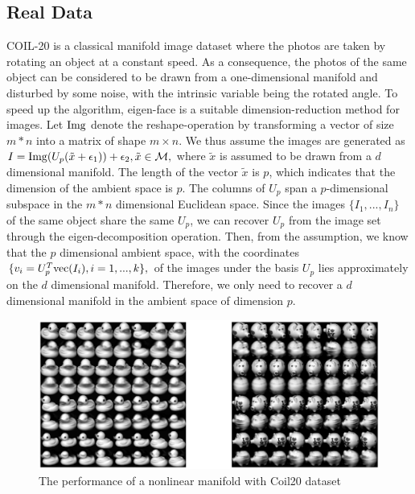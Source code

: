 \documentclass{article}
\theoremstyle{remark}
\begin{document}
\subsection{Real Data}
COIL-20 \cite{COIL-20} is a classical manifold image dataset where the photos are taken by rotating an object at a constant speed. As a consequence, the photos of the same object can be considered to be  drawn from a one-dimensional manifold and disturbed by some noise, with the intrinsic variable being the rotated angle. %
To speed up the algorithm, eigen-face is a suitable dimension-reduction method for images. Let ${\rm Img}$ denote the reshape-operation by transforming a vector of size $m*n$ into a matrix of shape $m\times n$. We thus assume the images are generated as
$
I = {\rm Img} (U_{p}(\tilde{x}+\epsilon_1))+\epsilon_2, \tilde{x}\in \cal M,
$
where $\tilde{x}$ is assumed to be drawn from a $d$ dimensional manifold. The length of the vector $\tilde{x}$ is $p$, which indicates that the dimension of the ambient space is $p$. The columns of $U_p$ span a $p$-dimensional subspace in the $m*n$ dimensional Euclidean space. 
Since the images $\{I_1,...,I_n\}$ of the same object share the same $U_p$, we can recover $U_p$ from the image set through the eigen-decomposition operation. Then, from the assumption, we know that the $p$ dimensional ambient space, with the coordinates 
$
\{v_i = U_p^T {\rm vec}(I_i), i = 1,...,k\},
$
of the images under the basis $U_p$ lies approximately on the $d$ dimensional manifold. Therefore, we only need to recover a $d$ dimensional manifold in the ambient space of dimension $p$.


\begin{figure}[h] %
   \centering
   \includegraphics[width=\linewidth]{real.eps} 
   \vspace{-0.4cm}
   \caption{The performance of a nonlinear manifold with Coil20 dataset}
   \label{fig:example Coil20}
\end{figure}
\end{document}
